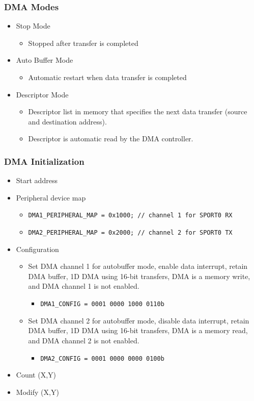 \subsubsection{DMA Modes}
\begin{itemize}
	\item Stop Mode
	\begin{itemize}
		\item Stopped after transfer is completed
	\end{itemize}
	\item Auto Buffer Mode
	\begin{itemize}
		\item Automatic restart when data transfer is completed
	\end{itemize}
	\item Descriptor Mode
	\begin{itemize}
		\item Descriptor list in memory that specifies the next
		data transfer (source and destination address).
		\item Descriptor is automatic read by the DMA controller.
	\end{itemize}
\end{itemize}

\subsubsection{DMA Initialization}
\begin{itemize}
	\item Start address
	\item Peripheral device map
	\begin{itemize}
		\item \texttt{DMA1_PERIPHERAL_MAP = 0x1000; // channel 1 for SPORT0 RX}
		\item \texttt{DMA2_PERIPHERAL_MAP = 0x2000; // channel 2 for SPORT0 TX}
	\end{itemize}
	\item Configuration
	\begin{itemize}
		\item Set DMA channel 1 for autobuffer mode, enable data interrupt,
		retain DMA buffer, 1D DMA using 16-bit transfers, DMA is a memory write, and DMA channel 1 is not enabled.
		\begin{itemize}
			\item \texttt{DMA1_CONFIG = 0001 0000 1000 0110b}
		\end{itemize}
		\item Set DMA channel 2 for autobuffer mode, disable data interrupt,
		retain DMA buffer, 1D DMA using 16-bit transfers, DMA is a memory
		read, and DMA channel 2 is not enabled.
		\begin{itemize}
			\item \texttt{DMA2_CONFIG = 0001 0000 0000 0100b}
		\end{itemize}
	\end{itemize} 
	\item Count (X,Y)
	\item Modify (X,Y)
\end{itemize}
